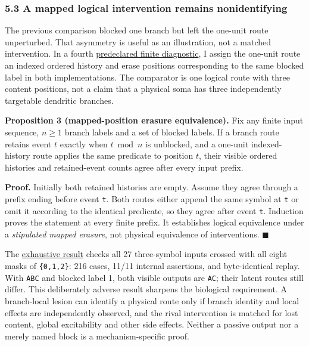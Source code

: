 \documentclass[
  american,
  11pt,
  letterpaper,
]{article}
\begin{document}
\subsubsection{5.3 A mapped logical intervention remains nonidentifying}\label{a-mapped-logical-intervention-remains-nonidentifying}

The previous comparison blocked one branch but left the one-unit route unperturbed. That asymmetry is useful as an illustration, not a matched intervention. In a fourth \href{https://github.com/v5ma/v5ma.github.io/blob/f6d3867df89ae9dea32f763b1d55c84212c41cc6/papers/companions/five-papers-20260923/temporal/paper/applications/mapped-intervention-v04/PROTOCOL.md}{predeclared finite diagnostic}, I assign the one-unit route an indexed ordered history and erase positions corresponding to the same blocked label in both implementations. The comparator is one logical route with three content positions, not a claim that a physical soma has three independently targetable dendritic branches.

\textbf{Proposition 3 (mapped-position erasure equivalence).} Fix any finite input sequence, \(n\geq1\) branch labels and a set of blocked labels. If a branch route retains event \(t\) exactly when \(t\bmod n\) is unblocked, and a one-unit indexed-history route applies the same predicate to position \(t\), their visible ordered histories and retained-event counts agree after every input prefix.

\textbf{Proof.} Initially both retained histories are empty. Assume they agree through a prefix ending before event \texttt{t}. Both routes either append the same symbol at \texttt{t} or omit it according to the identical predicate, so they agree after event \texttt{t}. Induction proves the statement at every finite prefix. It establishes logical equivalence under a \emph{stipulated mapped erasure}, not physical equivalence of interventions. \(\blacksquare\)

The \href{https://github.com/v5ma/v5ma.github.io/blob/f6d3867df89ae9dea32f763b1d55c84212c41cc6/papers/companions/five-papers-20260923/temporal/paper/applications/mapped-intervention-v04/README.md}{exhaustive result} checks all 27 three-symbol inputs crossed with all eight masks of \texttt{\{0,1,2\}}: 216 cases, 11/11 internal assertions, and byte-identical replay. With \texttt{ABC} and blocked label 1, both visible outputs are \texttt{AC}; their latent routes still differ. This deliberately adverse result sharpens the biological requirement. A branch-local lesion can identify a physical route only if branch identity and local effects are independently observed, and the rival intervention is matched for lost content, global excitability and other side effects. Neither a passive output nor a merely named block is a mechanism-specific proof.
\end{document}
